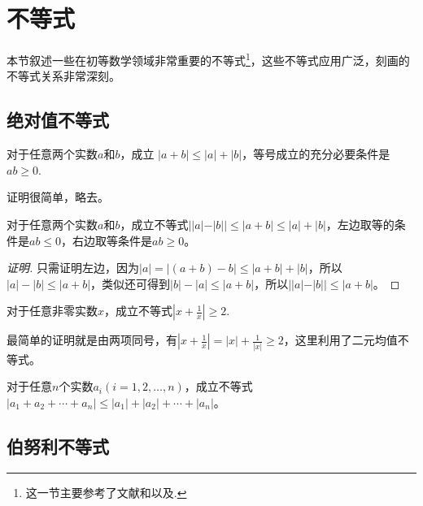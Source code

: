 
\section{不等式}
\label{sec:some-important-inequation}

本节叙述一些在初等数学领域非常重要的不等式\footnote{这一节主要参考了文献\cite{contest-math-course}和\cite{calculus-course}以及\cite{olympic-math}.}，这些不等式应用广泛，刻画的不等式关系非常深刻。

\subsection{绝对值不等式}
\label{sec:absolute-value-inequality}

\begin{theorem}
  对于任意两个实数$a$和$b$，成立 $|a+b| \leqslant |a| + |b|$，等号成立的充分必要条件是$ab \geqslant 0$.
\end{theorem}

证明很简单，略去。

\begin{inference}
  对于任意两个实数$a$和$b$，成立不等式$||a|-|b|| \leqslant |a+b| \leqslant |a| + |b|$，左边取等的条件是$ab \leqslant 0$，右边取等条件是$ab \geqslant 0$。
\end{inference}

\begin{proof}[证明]
  只需证明左边，因为$|a|=|(a+b)-b| \leqslant |a+b| + |b|$，所以$|a|-|b| \leqslant |a+b|$，类似还可得到$|b|-|a| \leqslant |a+b|$，所以$||a|-|b|| \leqslant |a+b|$。
\end{proof}

\begin{example}
  对于任意非零实数$x$，成立不等式$\left| x+\frac{1}{x} \right| \geqslant 2$.

  最简单的证明就是由两项同号，有$\left| x+\frac{1}{x} \right| = |x|+\frac{1}{|x|} \geqslant 2$，这里利用了二元均值不等式。
\end{example}

\begin{inference}
  对于任意$n$个实数$a_i(i=1,2,\ldots,n)$，成立不等式$|a_1+a_2+\cdots+a_n| \leqslant |a_1| + |a_2| + \cdots + |a_n|$。
\end{inference}

\subsection{伯努利不等式}
\label{sec:bernoulli-inequality}

